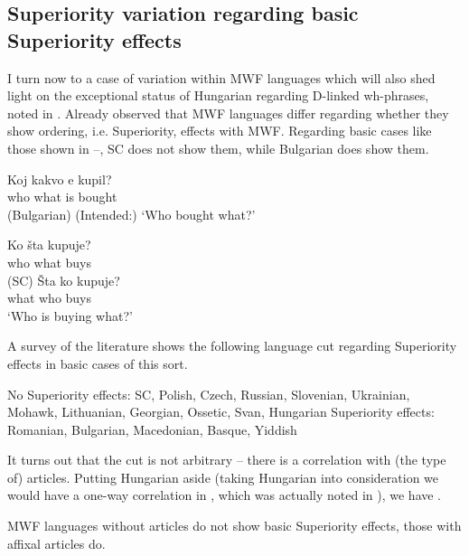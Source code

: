 \documentclass[output=paper,colorlinks,citecolor=brown]{langscibook}
\begin{document}
\subsection{Superiority variation regarding basic Superiority effects} \label{sec:bosk:2.2}

I turn now to a case of variation within MWF languages which will also shed light on the exceptional status of Hungarian regarding D-linked wh-phrases, noted in . Already \citet{bos:Rudin1988} observed that MWF languages differ regarding whether they show ordering, i.e. Superiority, effects with MWF. Regarding basic cases like those shown in --, SC does not show them, while Bulgarian does show them.

 
\ea\label{ex:bosk:26BG}
\ea\label{ex:bosk:26BGa} 
\gll Koj  kakvo  e kupil?\\
    who  what   is bought\\\hfill (Bulgarian)
\label{ex:bosk:26BGb}
\z 
(Intended:) `Who bought what?'            
\z 

\ea\label{ex:bosk:26SC}
\ea 
\gll Ko  šta    kupuje?\\
who what buys\\\hfill (SC)\label{ex:bosk:26SCa} 
\ex 
\gll Šta ko kupuje?\\
what who buys\\\label{ex:bosk:26SCb}
\z 
`Who is buying what?'
\z 

\noindent A survey of the literature shows the following language cut regarding Superiority effects in basic cases of this sort.

 
\ea\label{ex:bosk:27}
\ea No Superiority effects: SC, Polish, Czech, Russian, Slovenian, Ukrainian, Mohawk, Lithuanian, Georgian, Ossetic, Svan, Hungarian
\ex Superiority effects: Romanian, Bulgarian, Macedonian, Basque, Yiddish
\z 
\z

\noindent It turns out that the cut is not arbitrary -- there is a correlation with (the type of) articles. Putting Hungarian aside (taking Hungarian into consideration we would have a one-way correlation in , which was actually noted in \citealt{Bošković2008}), we have .

 
\ea\label{ex:bosk:28}
MWF languages without articles do not show basic Superiority effects, those with affixal articles do.
\z 
\end{document}
